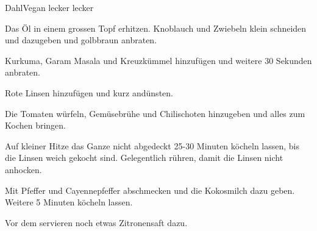 
\begin{recipe}[]{Dahl}{Vegan lecker lecker}{}



\step
Das \"Ol in einem grossen Topf erhitzen. Knoblauch und Zwiebeln klein schneiden und dazugeben und golbbraun anbraten.

\step
Kurkuma, Garam Masala und Kreuzk\"ummel hinzuf\"ugen und weitere 30 Sekunden anbraten.

\step
Rote Linsen hinzuf\"ugen und kurz and\"unsten.

\step
Die Tomaten w\"urfeln, Gem\"usebr\"uhe und Chilischoten hinzugeben und alles zum Kochen bringen.


\step
Auf kleiner Hitze das Ganze nicht abgedeckt 25-30 Minuten k\"ocheln lassen, bis die Linsen weich gekocht sind.
Gelegentlich r\"uhren, damit die Linsen nicht anhocken.

\step
Mit Pfeffer und Cayennepfeffer abschmecken und die Kokosmilch dazu geben. Weitere 5 Minuten k\"ocheln lassen.

\step
Vor dem servieren noch etwas Zitronensaft dazu.


\end{recipe}
